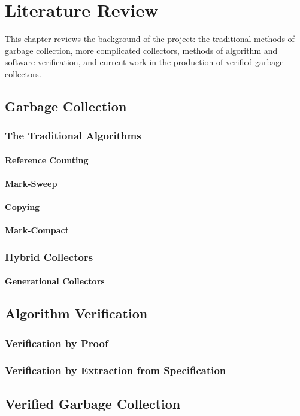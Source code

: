 \chapter{Literature Review}

This chapter reviews the background of the project: the traditional
methods of garbage collection, more complicated collectors, methods of
algorithm and software verification, and current work in the
production of verified garbage collectors.

\section{Garbage Collection}

\subsection{The Traditional Algorithms}

\subsubsection{Reference Counting}

\subsubsection{Mark-Sweep}

\subsubsection{Copying}

\subsubsection{Mark-Compact}

\subsection{Hybrid Collectors}

\subsubsection{Generational Collectors}

\section{Algorithm Verification}

\subsection{Verification by Proof}

\subsection{Verification by Extraction from Specification}

\section{Verified Garbage Collection}
